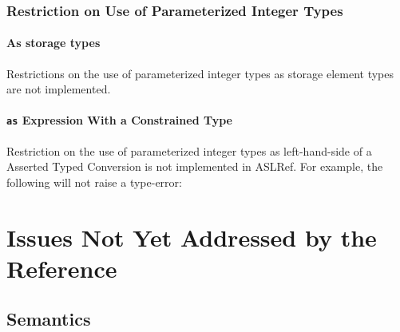\subsection{Restriction on Use of Parameterized Integer Types}

\subsubsection{As storage types}
Restrictions on the use of parameterized integer types as storage element types are not
implemented.


\subsubsection{\texttt{as} Expression With a Constrained Type}

Restriction on the use of parameterized integer types as left-hand-side of a
Asserted Typed Conversion is not implemented in ASLRef.
%
For example, the following will not raise a type-error:


\chapter{Issues Not Yet Addressed by the Reference\label{appendix:MissingTransliteration}}
\section{Semantics}




